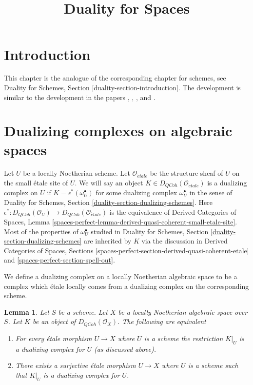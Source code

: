 \documentclass{stacks-project}
\theoremstyle{plain}
\newtheorem{lemma}[subsection]{Lemma}
\theoremstyle{definition}
\theoremstyle{remark}
\numberwithin{equation}{subsection}
\def\etale{{\acute{e}tale}}
\def\QCoh{\mathit{QCoh}}
\begin{document}
\title{Duality for Spaces}


\maketitle

\label{section-phantom}

\tableofcontents

\section{Introduction}
\label{section-introduction}

\noindent
This chapter is the analogue of the corresponding chapter for
schemes, see Duality for Schemes, Section \ref{duality-section-introduction}.
The development is similar to the development in the papers
\cite{Neeman-Grothendieck}, \cite{LN},
\cite{Lipman-notes}, and \cite{Neeman-improvement}.




\section{Dualizing complexes on algebraic spaces}
\label{section-dualizing-spaces}

\noindent
Let $U$ be a locally Noetherian scheme. Let $\mathcal{O}_\etale$
be the structure sheaf of $U$ on the small \'etale site of $U$.
We will say an object $K \in D_\QCoh(\mathcal{O}_\etale)$ is
a dualizing complex on $U$ if $K = \epsilon^*(\omega_U^\bullet)$
for some dualizing complex $\omega_U^\bullet$ in the sense of
Duality for Schemes, Section \ref{duality-section-dualizing-schemes}.
Here $\epsilon^* : D_\QCoh(\mathcal{O}_U) \to D_\QCoh(\mathcal{O}_\etale)$
is the equivalence of Derived Categories of Spaces, Lemma
\ref{spaces-perfect-lemma-derived-quasi-coherent-small-etale-site}.
Most of the properties of $\omega_U^\bullet$ studied in
Duality for Schemes, Section \ref{duality-section-dualizing-schemes}
are inherited by $K$ via the discussion in
Derived Categories of Spaces, Sections
\ref{spaces-perfect-section-derived-quasi-coherent-etale} and
\ref{spaces-perfect-section-spell-out}.

\medskip\noindent
We define a dualizing complex on a locally Noetherian algebraic space
to be a complex which \'etale locally comes from a dualizing
complex on the corresponding scheme.

\begin{lemma}
\label{lemma-equivalent-definitions}
Let $S$ be a scheme. Let $X$ be a locally Noetherian algebraic space over $S$.
Let $K$ be an object of $D_\QCoh(\mathcal{O}_X)$. The following are equivalent
\begin{enumerate}
\item For every \'etale morphism $U \to X$ where $U$ is a scheme
the restriction $K|_U$ is a dualizing complex for $U$ (as discussed above).
\item There exists a surjective \'etale morphism $U \to X$ where $U$ is a
scheme such that $K|_U$ is a dualizing complex for $U$.
\end{enumerate}
\end{lemma}
\end{document}
